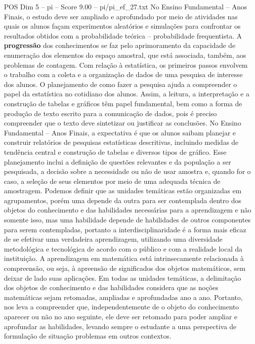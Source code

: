 \begin{textsample}{POS Dim 5 – pi – Score 9.00 – pi/pi\_ef\_27.txt}
No Ensino Fundamental – Anos Finais, o estudo deve ser ampliado e aprofundado por meio de atividades nas quais os alunos façam experimentos aleatórios e simulações para confrontar os resultados obtidos com a probabilidade teórica – probabilidade frequentista.
A \textbf{progressão} dos conhecimentos se faz pelo aprimoramento da capacidade de enumeração dos elementos do espaço amostral, que está associada, também, aos problemas de contagem.
Com relação à estatística, os primeiros passos envolvem o trabalho com a coleta e a organização de dados de uma pesquisa de interesse dos alunos.
O planejamento de como fazer a pesquisa ajuda a compreender o papel da estatística no cotidiano dos alunos.
Assim, a leitura, a interpretação e a construção de tabelas e gráficos têm papel fundamental, bem como a forma de produção de texto escrito para a comunicação de dados, pois é preciso compreender que o texto deve sintetizar ou justificar as conclusões.
No Ensino Fundamental – Anos Finais, a expectativa é que os alunos saibam planejar e construir relatórios de pesquisas estatísticas descritivas, incluindo medidas de tendência central e construção de tabelas e diversos tipos de gráfico.
Esse planejamento inclui a definição de questões relevantes e da população a ser pesquisada, a decisão sobre a necessidade ou não de usar amostra e, quando for o caso, a seleção de seus elementos por meio de uma adequada técnica de amostragem.
Podemos definir que as unidades temáticas estão organizadas em agrupamentos, porém uma depende da outra para ser contemplada dentro dos objetos do conhecimento e das habilidades necessárias para a aprendizagem e não somente isso, mas uma habilidade depende de habilidades de outros componentes para serem contempladas, portanto a interdisciplinaridade é a forma mais eficaz de se efetivar uma verdadeira aprendizagem, utilizando uma diversidade metodológica e tecnológica de acordo com o público e com a realidade local da instituição.
A aprendizagem em matemática está intrinsecamente relacionada à compreensão, ou seja, à apreensão de significados dos objetos matemáticos, sem deixar de lado suas aplicações.
Em todas as unidades temáticas, a delimitação dos objetos de conhecimento e das habilidades considera que as noções matemáticas sejam retomadas, ampliadas e aprofundadas ano a ano.
Portanto, nos leva a compreender que, independentemente de o objeto do conhecimento aparecer ou não no ano seguinte, ele deve ser retomado para poder ampliar e aprofundar as habilidades, levando sempre o estudante a uma perspectiva de formulação de situação problemas em outros contextos.

\end{textsample}

